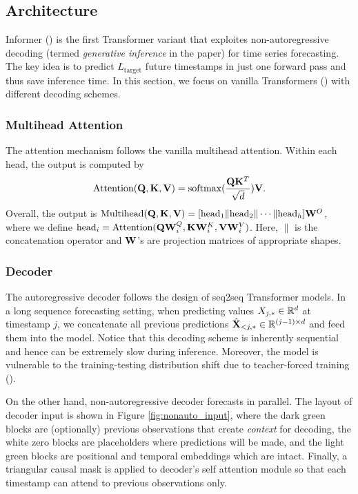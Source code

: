 \subsection{Architecture}
Informer (\citet{https://doi.org/10.48550/arxiv.2012.07436}) is the first Transformer variant that exploites non-autoregressive decoding (termed \textit{generative inference} in the paper) for time series forecasting. 
The key idea is to predict $L_\text{target}$ future timestamps in just one forward pass and thus save inference time. 
In this section, we focus on vanilla Transformers (\citet{https://doi.org/10.48550/arxiv.1706.03762}) with different decoding schemes. 

\subsubsection{Multihead Attention}
The attention mechanism follows the vanilla multihead attention. 
Within each head, the output is computed by $$\text{Attention}(\mathbf{Q}, \mathbf{K}, \mathbf{V}) = \text{softmax}(\frac{\mathbf{Q}\mathbf{K}^T}{\sqrt{d}}) \mathbf{V}.$$
Overall, the output is $\text{Multihead}(\mathbf{Q}, \mathbf{K}, \mathbf{V}) = [\text{head}_1 \| \text{head}_2 \| \cdots \| \text{head}_h]\mathbf{W}^O$, where we define $\text{head}_i = \text{Attention}(\mathbf{Q}\mathbf{W}_i^Q, \mathbf{K}\mathbf{W}_i^K, \mathbf{V}\mathbf{W}_i^V)$. 
Here, $\|$ is the concatenation operator and $\mathbf{W}$'s are projection matrices of appropriate shapes. 

\subsubsection{Decoder}
The autoregressive decoder follows the design of seq2seq Transformer models. 
In a long sequence forecasting setting, when predicting values $X_{j, *} \in \mathbb{R}^{d}$ at timestamp $j$, we concatenate all previous predictions $\hat{\mathbf{X}}_{<j, *} \in \mathbb{R}^{(j - 1) \times d}$ and feed them into the model.  
Notice that this decoding scheme is inherently sequential and hence can be extremely slow during inference. 
Moreover, the model is vulnerable to the training-testing distribution shift due to teacher-forced training (\citet{6795228}). 

On the other hand, non-autoregressive decoder forecasts in parallel. 
The layout of decoder input is shown in Figure \ref{fig:nonauto_input}, where the dark green blocks are (optionally) previous observations that create \textit{context} for decoding, 
the white zero blocks are placeholders where predictions will be made, 
and the light green blocks are positional and temporal embeddings which are intact. 
Finally, a triangular causal mask is applied to decoder's self attention module so that each timestamp can attend to previous observations only. 

